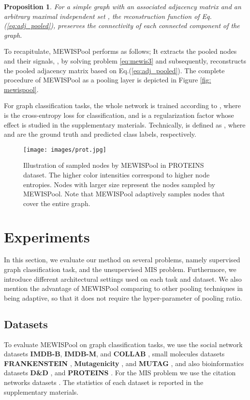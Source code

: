 \documentclass{article}
\newtheorem{prop}{Proposition}
\begin{document}
\begin{prop}\label{prop5}
	For a simple graph  with an associated adjacency matrix  and an arbitrary maximal independent set , the reconstruction function of Eq.(\ref{eq:adj_pooled}), preserves the connectivity of each connected component of the graph.
\end{prop}
To recapitulate, MEWISPool performs as follows; It extracts the pooled nodes and their signals, , by solving problem \ref{eq:mewis3} and subsequently, reconstructs the pooled adjacency matrix based on Eq.(\ref{eq:adj_pooled}). The complete procedure of MEWISPool as a pooling layer is depicted in Figure \ref{fig: mewispool}.

For graph classification tasks, the whole network is trained according to , where  is the cross-entropy loss for classification, and  is a regularization factor whose effect is studied in the supplementary materials. Technically,  is defined as , where  and  are the ground truth and predicted class labels, respectively.

\begin{figure*}[t]
	\vskip 0.2in
	\begin{center}
		\centerline{\texttt{[image: images/prot.jpg]}}
		\caption{\scriptsize Illustration of sampled nodes by MEWISPool in PROTEINS dataset\cite{dd1prot,enzprot}. The higher color intensities correspond to higher node entropies. Nodes with larger size represent the nodes sampled by MEWISPool. Note that MEWISPool adaptively samples nodes that cover the entire graph.}
		\label{fig:enz}
	\end{center}
	\vskip -0.2in
\end{figure*}

\section{Experiments}
\label{sec:experiments}
In this section, we evaluate our method on several problems, namely supervised graph classification task, and the unsupervised MIS problem. Furthermore, we introduce different architectural settings used on each task and dataset. We also mention the advantage of MEWISPool comparing to other pooling techniques in being adaptive, so that it does not require the hyper-parameter of pooling ratio.

\subsection{Datasets}\label{subsec:datasets}
To evaluate MEWISPool on graph classification tasks, we use the social network datasets \textbf{IMDB-B}, \textbf{IMDB-M}, and \textbf{COLLAB} \cite{imdbcollab}, small molecules datasets \textbf{FRANKENSTEIN} \cite{frankenstein}, \textbf{Mutagenicity} \cite{mutagenicity1}, and \textbf{MUTAG} \cite{mutag1}, and also bioinformatics datasets \textbf{D\&D} \cite{dd2}, and \textbf{PROTEINS} \cite{dd1prot}. For the MIS problem we use the citation networks datasets \cite{citationnetworks}. The statistics of each dataset is reported in the supplementary materials.
\end{document}
